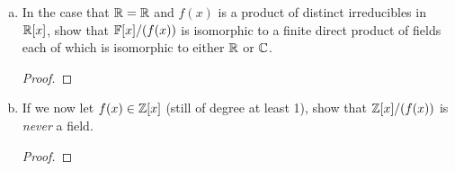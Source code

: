 \begin{itemize}
\begin{enumerate}[(a)]
\begin{proof}
\end{proof}

\item In the case that $\mathbb{R} = \mathbb{R}$ and $f(x)$ is a product of distinct irreducibles
in $\mathbb{R}[x]$, show that $\mathbb{F}[x]/(f(x))$ is isomorphic to a finite direct product of fields
each of which is isomorphic to either $\mathbb{R}$ or $\mathbb{C}$.
\begin{proof}

\end{proof}

\item If we now let $f(x) \in \mathbb{Z}[x]$ (still of degree at least 1), show that $\mathbb{Z}[x]/(f(x))$ is \textit{never} a field.
\begin{proof}

\end{proof}
\end{enumerate}



















\end{itemize}